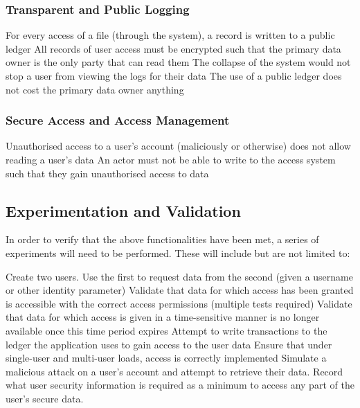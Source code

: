 \subsubsection{Transparent and Public Logging}

\begin{outline}
  \1 For every access of a file (through the system), a record is written to a public ledger
  \1 All records of user access must be encrypted such that the primary data owner is the only party that can read them
  \1 The collapse of the system would not stop a user from viewing the logs for their data
  \1 The use of a public ledger does not cost the primary data owner anything
\end{outline}

\subsubsection{Secure Access and Access Management}

\begin{outline}
  \1 Unauthorised access to a user's account (maliciously or otherwise) does not allow reading a user's data
  \1 An actor must not be able to write to the access system such that they gain unauthorised access to data
\end{outline}

\subsection{Experimentation and Validation}

In order to verify that the above functionalities have been met, a series of experiments will need to be performed. These will include but are not limited to:

\begin{outline}
  \1 Create two users. Use the first to request data from the second (given a username or other identity parameter)
  \1 Validate that data for which access has been granted is accessible with the correct access permissions (multiple tests required)
  \1 Validate that data for which access is given in a time-sensitive manner is no longer available once this time period expires
  \1 Attempt to write transactions to the ledger the application uses to gain access to the user data
  \1 Ensure that under single-user and multi-user loads, access is correctly implemented
  \1 Simulate a malicious attack on a user's account and attempt to retrieve their data. Record what user security information is required as a minimum to access any part of the user's secure data.
\end{outline}

